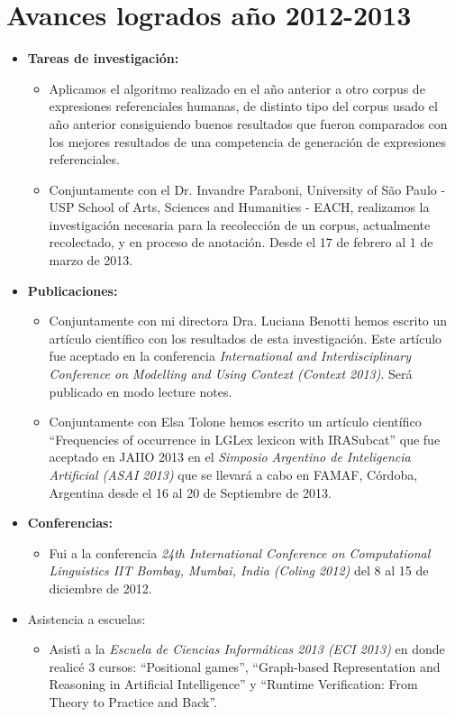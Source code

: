 \section{Avances logrados a\~no 2012-2013 }
\label{progreso}

\begin{itemize}
\item \textbf{Tareas de investigaci\'on:}
\begin{itemize}
\item Aplicamos el algoritmo realizado en el a\~no anterior a otro corpus de expresiones referenciales humanas, de distinto tipo del corpus usado el a\~no anterior consiguiendo buenos resultados que fueron comparados con los mejores resultados de una competencia de generaci\'on de expresiones referenciales. 

\item Conjuntamente con el Dr. Invandre Paraboni, University of S\~ao Paulo - USP 
School of Arts, Sciences and Humanities - EACH, realizamos la investigaci\'on necesaria para la recolecci\'on de un corpus, actualmente recolectado, y en proceso de anotaci\'on. Desde el 17 de febrero al 1 de marzo de 2013.
\end{itemize}
\item \textbf{Publicaciones:} 
\begin{itemize}
\item Conjuntamente con mi directora Dra. Luciana Benotti hemos escrito un art\'iculo cient\'ifico con los resultados de esta investigaci\'on. Este art\'iculo fue aceptado en la conferencia \emph{International and Interdisciplinary Conference on Modelling and Using Context (Context 2013)}. Ser\'a publicado en modo lecture notes.
\item Conjuntamente con Elsa Tolone hemos escrito un art\'iculo cient\'ifico ``Frequencies of occurrence in LGLex lexicon with IRASubcat'' que fue aceptado en JAIIO 2013 en el \emph{Simposio Argentino de Inteligencia Artificial (ASAI 2013)} que se llevar\'a a cabo en FAMAF, C\'ordoba, Argentina desde el 16 al 20 de Septiembre de 2013.
\end{itemize}

\item \textbf{Conferencias:}
\begin{itemize}
\item Fui a la conferencia \emph{24th International Conference on Computational Linguistics IIT Bombay, Mumbai, India (Coling 2012)} del 8 al 15 de diciembre de 2012.
\end{itemize}
\item Asistencia a escuelas:
\begin{itemize}
\item Asist\'{\i} a la \emph{Escuela de Ciencias Inform\'aticas 2013 (ECI 2013)} en donde realic\'e 3 cursos: ``Positional games'', ``Graph-based Representation and Reasoning in Artificial Intelligence'' y ``Runtime Verification: From Theory to Practice and Back''.
\end{itemize}


\end{itemize}
